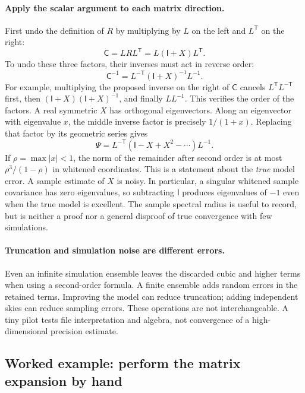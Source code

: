 \documentclass[11pt]{article}
\newcommand{\Cov}{\mathsf{C}}
\newcommand{\I}{\mathsf{I}}
\newcommand{\T}{^{\mathsf{T}}}
\begin{document}
\paragraph{Apply the scalar argument to each matrix direction.}
First undo the definition of $R$ by multiplying by $L$ on the left
and $L\T$ on the right:
\begin{equation}
 \Cov=LRL\T=L(\I+X)L\T.
\end{equation}
To undo these three factors, their inverses must act in reverse order:
\begin{equation}
 \Cov^{-1}=L^{-\mathsf T}(\I+X)^{-1}L^{-1}.
\end{equation}
For example, multiplying the proposed inverse on the right of $\Cov$
cancels $L\T L^{-\mathsf T}$ first, then $(\I+X)(\I+X)^{-1}$,
and finally $LL^{-1}$. This verifies the order of the factors.
A real symmetric $X$ has orthogonal eigenvectors. Along an eigenvector with
eigenvalue $x$, the middle inverse factor is precisely $1/(1+x)$.
Replacing that factor by its geometric series gives
\begin{equation}
 \Psi=L^{-\mathsf T}(\I-X+X^2-\cdots)L^{-1}.
 \label{eq:series}
\end{equation}
If $\rho=\max|x|<1$, the norm of the remainder after second order is at most
$\rho^3/(1-\rho)$ in whitened coordinates. This is a statement about the
\emph{true} model error. A sample estimate of $X$ is noisy. In particular,
a singular whitened sample covariance has zero eigenvalues, so subtracting
$\I$ produces eigenvalues of $-1$ even when the true model is excellent.
The sample spectral radius is useful to record, but is neither a proof nor
a general disproof of true convergence with few simulations.

\paragraph{Truncation and simulation noise are different errors.}
Even an infinite simulation ensemble leaves the discarded cubic and higher
terms when using a second-order formula. A finite ensemble adds random
errors in the retained terms. Improving the model can reduce truncation;
adding independent skies can reduce sampling errors. These operations are
not interchangeable. A tiny pilot tests file interpretation and algebra,
not convergence of a high-dimensional precision estimate.


\subsection{Worked example: perform the matrix expansion by hand}
\label{sec:matrix-example}
\end{document}
